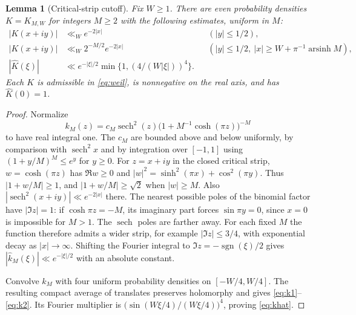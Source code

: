 \documentclass[11pt]{article}
\newtheorem{lemma}[theorem]{Lemma}
\DeclareMathOperator{\sech}{sech}\DeclareMathOperator{\arsinh}{arsinh}
\newcommand{\wh}{\widehat}
\begin{document}
\begin{lemma}[Critical-strip cutoff]\label{lem:kernel}
Fix $W\ge1$. There are even probability densities $K=K_{M,W}$ for integers
$M\ge2$ with the following estimates, uniform in $M$:
\begin{align}
 |K(x+iy)|&\ll_W e^{-2|x|} &&(|y|\le1/2),\label{eq:k1}\\
 |K(x+iy)|&\ll_W 2^{-M/2}e^{-2|x|}
       &&(|y|\le1/2,\ |x|\ge W+\pi^{-1}\arsinh M),\label{eq:k2}\\
 |\wh K(\xi)|&\ll e^{-|\xi|/2}\min\{1,(4/(W|\xi|))^4\}.
       \label{eq:khat}
\end{align}
Each $K$ is admissible in \eqref{eq:weil}, is nonnegative on the real axis,
and has $\wh K(0)=1$.
\end{lemma}
\begin{proof}
Normalize
\[
 k_M(z)=c_M\sech^2(z)\big(1+M^{-1}\cosh(\pi z)\big)^{-M}
\]
to have real integral one. The $c_M$ are bounded above and below uniformly,
by comparison with $\sech^2 x$ and by integration over $[-1,1]$ using
$(1+y/M)^M\le e^y$ for $y\ge0$. For $z=x+iy$ in the closed critical strip,
$w=\cosh(\pi z)$ has $\Re w\ge0$ and
$|w|^2=\sinh^2(\pi x)+\cos^2(\pi y)$. Thus $|1+w/M|\ge1$, and
$|1+w/M|\ge\sqrt2$ when $|w|\ge M$.
Also $|\sech^2(x+iy)|\ll e^{-2|x|}$ there.
The nearest possible poles of the binomial factor have $|\Im z|=1$:
if $\cosh\pi z=-M$, its imaginary part forces $\sin\pi y=0$,
since $x=0$ is impossible for $M>1$. The $\sech$ poles are farther away.
For each fixed $M$ the function therefore admits a wider strip, for example
$|\Im z|\le3/4$, with exponential decay as $|x|\to\infty$.
Shifting the Fourier integral to $\Im z=-\operatorname{sgn}(\xi)/2$
gives $|\wh k_M(\xi)|\ll e^{-|\xi|/2}$ with an absolute constant.

Convolve $k_M$ with four uniform probability densities on $[-W/4,W/4]$.
The resulting compact average of translates preserves holomorphy and
gives \eqref{eq:k1}--\eqref{eq:k2}. Its Fourier multiplier is
$\big(\sin(W\xi/4)/(W\xi/4)\big)^4$, proving \eqref{eq:khat}.
\end{proof}
\end{document}
